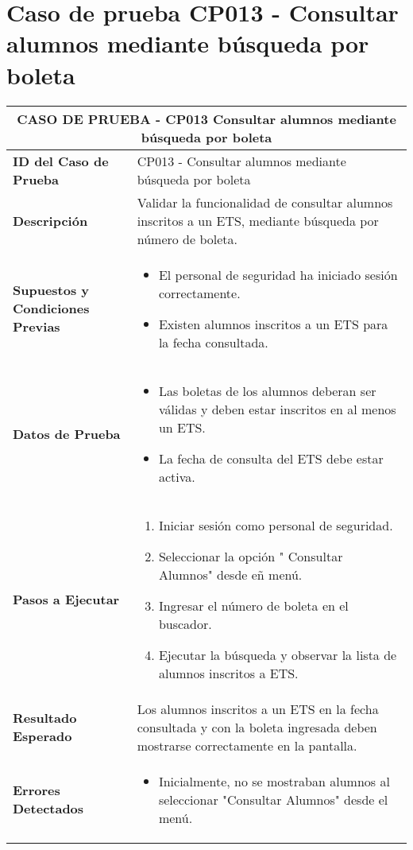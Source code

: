 \section{Caso de prueba CP013 - Consultar alumnos mediante búsqueda por boleta}

\begin{longtable}{|p{5cm}|p{10cm}|}
	\hline
	\multicolumn{2}{|c|}{\textbf{CASO DE PRUEBA - CP013 Consultar alumnos mediante búsqueda por boleta}} \\
	\hline
	\textbf{ID del Caso de Prueba} & CP013 - Consultar alumnos mediante búsqueda por boleta \\
	\hline
	\textbf{Descripción} & Validar la funcionalidad de consultar alumnos inscritos a un ETS, mediante búsqueda por número de boleta. \\
	\hline
	\textbf{Supuestos y Condiciones Previas} & 
	\begin{itemize}
		\item El personal de seguridad ha iniciado sesión correctamente.
		\item Existen alumnos inscritos a un ETS para la fecha consultada.
	\end{itemize} \\
	\hline
	\textbf{Datos de Prueba} & 
	\begin{itemize}
		\item Las boletas de los alumnos deberan ser válidas y deben estar inscritos en al menos un ETS.
		\item La fecha de consulta del ETS debe estar activa.
	\end{itemize} \\
	\hline
	\textbf{Pasos a Ejecutar} & 
	\begin{enumerate}
		\item Iniciar sesión como personal de seguridad.
		\item Seleccionar la opción " Consultar Alumnos" desde eñ menú.
		\item Ingresar el número de boleta en el buscador.
		\item Ejecutar la búsqueda y observar la lista de alumnos inscritos a ETS.
	\end{enumerate} \\
	\hline
	\textbf{Resultado Esperado} & 
	Los alumnos inscritos a un ETS en la fecha consultada y con la boleta ingresada deben mostrarse correctamente en la pantalla. \\
	\hline
	\textbf{Errores Detectados} &
	\begin{itemize}
		\item Inicialmente, no se mostraban alumnos al seleccionar "Consultar Alumnos" desde el menú.

\end{itemize}
\end{longtable}
